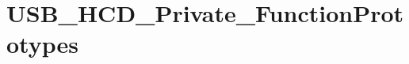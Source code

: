 \hypertarget{group___u_s_b___h_c_d___private___function_prototypes}{\section{U\-S\-B\-\_\-\-H\-C\-D\-\_\-\-Private\-\_\-\-Function\-Prototypes}
\label{group___u_s_b___h_c_d___private___function_prototypes}
}
